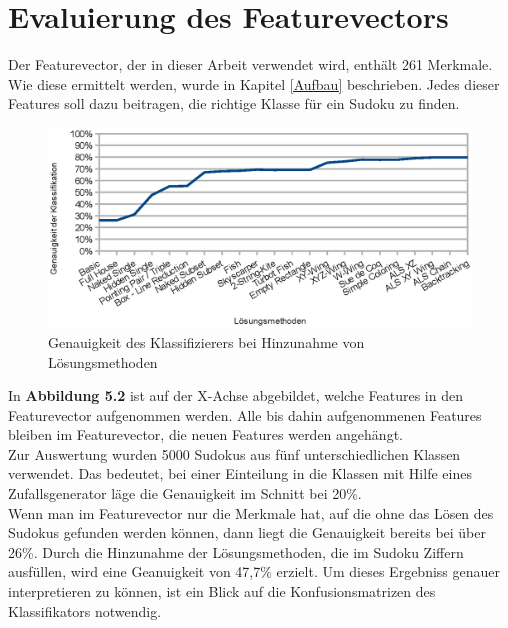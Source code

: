 \newpage
\section{Evaluierung des Featurevectors}
Der Featurevector, der in dieser Arbeit verwendet wird, enthält 261 Merkmale. Wie diese ermittelt werden, wurde in Kapitel \ref{Aufbau} beschrieben. Jedes dieser Features soll dazu beitragen, die richtige Klasse für ein Sudoku zu finden.\\

\begin{figure}[H]
    \includegraphics[width=\textwidth,height=\textheight,keepaspectratio]{./img/accuracy.eps}
    \caption{Genauigkeit des Klassifizierers bei Hinzunahme von Lösungsmethoden}
\end{figure}
\noindent In \textbf{Abbildung 5.2} ist auf der X-Achse abgebildet, welche Features in den Featurevector aufgenommen werden. Alle bis dahin aufgenommenen Features bleiben im Featurevector, die neuen Features werden angehängt.\\
Zur Auswertung wurden 5000 Sudokus aus fünf unterschiedlichen Klassen verwendet. Das bedeutet, bei einer Einteilung in die Klassen mit Hilfe eines Zufallsgenerator läge die Genauigkeit im Schnitt bei 20\%.\\
Wenn man im Featurevector nur die Merkmale hat, auf die ohne das Lösen des Sudokus gefunden werden können, dann liegt die Genauigkeit bereits bei über 26\%. Durch die Hinzunahme der Lösungsmethoden, die im Sudoku Ziffern ausfüllen, wird eine Geanuigkeit von 47,7\% erzielt. Um dieses Ergebniss genauer interpretieren zu können, ist ein Blick auf die Konfusionsmatrizen des Klassifikators notwendig.\\

